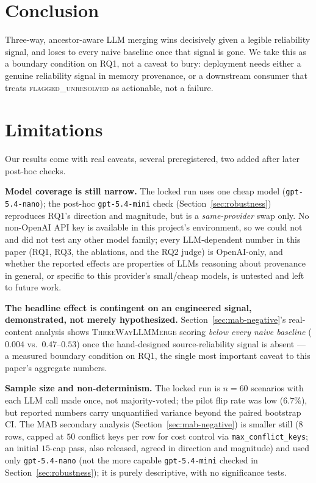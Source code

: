 \documentclass[11pt]{article}
\begin{document}
\section{Conclusion}
Three-way, ancestor-aware LLM merging wins decisively given a legible
reliability signal, and loses to every naive baseline once that signal is
gone. We take this as a boundary condition on RQ1, not a caveat to bury:
deployment needs either a genuine reliability signal in memory provenance,
or a downstream consumer that treats \textsc{flagged\_unresolved} as
actionable, not a failure.

\section*{Limitations}
\label{sec:limitations}

Our results come with real caveats, several preregistered, two added after
later post-hoc checks.

\noindent\textbf{Model coverage is still narrow.} The locked run uses one cheap
model (\texttt{gpt-5.4-nano}); the post-hoc \texttt{gpt-5.4-mini} check
(Section~\ref{sec:robustness}) reproduces RQ1's direction and magnitude, but is
a \emph{same-provider} swap only. No non-OpenAI API key is available in this
project's environment, so we could not and did not test any other model
family; every LLM-dependent number in this paper (RQ1, RQ3, the ablations,
and the RQ2 judge) is OpenAI-only, and whether the reported effects are
properties of LLMs reasoning about provenance in general, or specific to this
provider's small/cheap models, is untested and left to future work.

\noindent\textbf{The headline effect is contingent on an engineered signal,
demonstrated, not merely hypothesized.} Section~\ref{sec:mab-negative}'s
real-content analysis shows \textsc{ThreeWayLLMMerge} scoring \emph{below
every naive baseline} ($0.004$ vs.\ $0.47$--$0.53$) once the hand-designed
source-reliability signal is absent --- a measured boundary condition on RQ1,
the single most important caveat to this paper's aggregate numbers.

\noindent\textbf{Sample size and non-determinism.} The locked run is $n{=}60$
scenarios with each LLM call made once, not majority-voted; the pilot flip
rate was low ($6.7\%$), but reported numbers carry unquantified variance
beyond the paired bootstrap CI. The MAB secondary analysis
(Section~\ref{sec:mab-negative}) is smaller still ($8$ rows, capped at $50$
conflict keys per row for cost control via \texttt{max\_conflict\_keys}; an
initial $15$-cap pass, also released, agreed in direction and magnitude) and
used only \texttt{gpt-5.4-nano} (not the more capable \texttt{gpt-5.4-mini}
checked in Section~\ref{sec:robustness}); it is purely descriptive, with no
significance tests.
\end{document}

